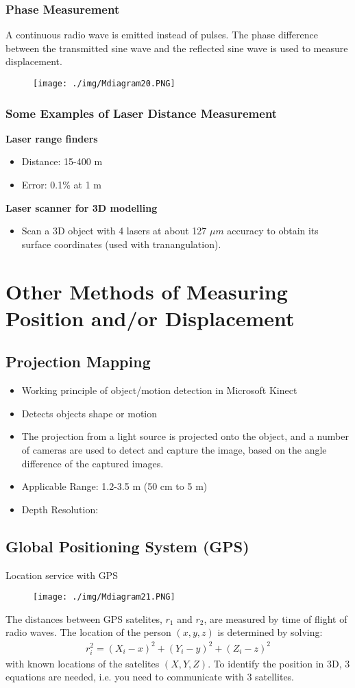 \subsubsection{Phase Measurement}
A continuous radio wave is emitted instead of pulses. The phase difference between the transmitted sine wave and the reflected sine wave is used to measure displacement.
\begin{figure}[H]
  \centering
  \texttt{[image: ./img/Mdiagram20.PNG]}
\end{figure}
\subsubsection{Some Examples of Laser Distance Measurement}
\textbf{Laser range finders}
\begin{itemize}
  \item Distance: 15-400 m
  \item Error: 0.1\% at 1 m
\end{itemize}
\textbf{Laser scanner for 3D modelling}
\begin{itemize}
  \item Scan a 3D object with 4 lasers at about 127 $\mu m$ accuracy to obtain its surface coordinates (used with tranangulation).
\end{itemize}
\section{Other Methods of Measuring Position and/or Displacement}
\subsection{Projection Mapping}
\begin{itemize}
  \item Working principle of object/motion detection in Microsoft Kinect
  \item Detects objects shape or motion
  \item The projection from a light source is projected onto the object, and a number of cameras are used to detect and capture the image, based on the angle difference of the captured images.
  \item Applicable Range: 1.2-3.5 m (50 cm to 5 m)
  \item Depth Resolution:
\end{itemize}
\subsection{Global Positioning System (GPS)}
Location service with GPS
\begin{figure}[H]
  \centering
  \texttt{[image: ./img/Mdiagram21.PNG]}
\end{figure}
The distances between GPS satelites, $r_1$ and $r_2$, are measured by time of flight of radio waves. The location of the person $(x,y,z)$ is determined by solving:
\begin{gather}
  r_i^2 = (X_i-x)^2+(Y_i-y)^2+(Z_i-z)^2
\end{gather}
with known locations of the satelites $(X,Y,Z)$. To identify the position in 3D, 3 equations are needed, i.e. you need to communicate with 3 satellites.
